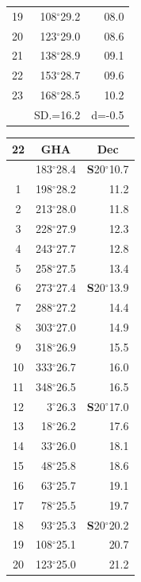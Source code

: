 \documentclass[10pt, a4paper]{report}
\begin{document}
\begin{scriptsize}
\begin{tabular*}{0.2\textwidth}[t]{@{\extracolsep{\fill}}|c|rr|}
19 & 108$^\circ$29.2 & 08.0\\
20 & 123$^\circ$29.0 & 08.6\\
21 & 138$^\circ$28.9 & \raisebox{0.24ex}{\boldmath$\cdot$~\boldmath$\cdot$~~}09.1\\
22 & 153$^\circ$28.7 & 09.6\\
23 & 168$^\circ$28.5 & 10.2\\
\hline
\rule{0pt}{2.4ex} & \multicolumn{1}{c}{SD.=16.2} & \multicolumn{1}{c|}{d=-0.5}\\
\hline
\end{tabular*}\noindent
\begin{tabular*}{0.2\textwidth}[t]{@{\extracolsep{\fill}}|c|rr|}
\hline
\multicolumn{1}{|c|}{\rule{0pt}{2.6ex}\textbf{22}} & \multicolumn{1}{c}{\textbf{GHA}} & \multicolumn{1}{c|}{\textbf{Dec}}\\
\hline\rule{0pt}{2.6ex}\noindent
0 & 183$^\circ$28.4 & \textbf{S}20$^\circ$10.7\\
1 & 198$^\circ$28.2 & 11.2\\
2 & 213$^\circ$28.0 & 11.8\\
3 & 228$^\circ$27.9 & \raisebox{0.24ex}{\boldmath$\cdot$~\boldmath$\cdot$~~}12.3\\
4 & 243$^\circ$27.7 & 12.8\\
5 & 258$^\circ$27.5 & 13.4\\[2Pt]
6 & 273$^\circ$27.4 & \textbf{S}20$^\circ$13.9\\
7 & 288$^\circ$27.2 & 14.4\\
8 & 303$^\circ$27.0 & 14.9\\
9 & 318$^\circ$26.9 & \raisebox{0.24ex}{\boldmath$\cdot$~\boldmath$\cdot$~~}15.5\\
10 & 333$^\circ$26.7 & 16.0\\
11 & 348$^\circ$26.5 & 16.5\\[2Pt]
12 & 3$^\circ$26.3 & \textbf{S}20$^\circ$17.0\\
13 & 18$^\circ$26.2 & 17.6\\
14 & 33$^\circ$26.0 & 18.1\\
15 & 48$^\circ$25.8 & \raisebox{0.24ex}{\boldmath$\cdot$~\boldmath$\cdot$~~}18.6\\
16 & 63$^\circ$25.7 & 19.1\\
17 & 78$^\circ$25.5 & 19.7\\[2Pt]
18 & 93$^\circ$25.3 & \textbf{S}20$^\circ$20.2\\
19 & 108$^\circ$25.1 & 20.7\\
20 & 123$^\circ$25.0 & 21.2\\

\end{tabular*}
\end{scriptsize}
\end{document}
